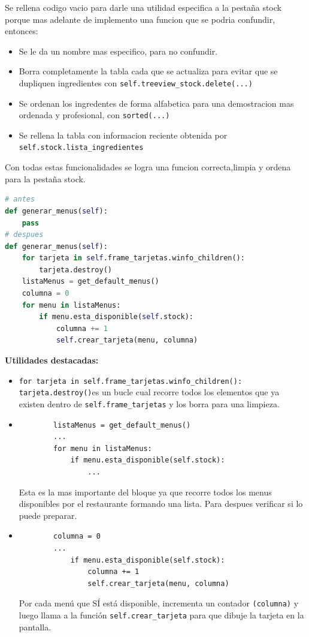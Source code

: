 \documentclass[a4paper,12pt]{article}
\begin{document}
Se rellena codigo vacio para darle una utilidad especifica a la pestaña stock porque mas adelante de implemento una funcion que se podria confundir, entonces:

\newpage

\begin{itemize}
    \item Se le da un nombre mas especifico, para no confundir.
    \item Borra completamente la tabla cada que se actualiza para evitar que se dupliquen ingredientes con \verb|self.treeview_stock.delete(...)|
    \item Se ordenan los ingredentes de forma alfabetica para una demostracion mas ordenada y profesional, con \verb|sorted(...)|
    \item Se rellena la tabla con informacion reciente obtenida por \verb|self.stock.lista_ingredientes|
\end{itemize}
Con todas estas funcionalidades se logra una funcion correcta,limpia y ordena para la pestaña stock.

\begin{lstlisting}[language=Python, caption={Implementaciones de codigo}, frame=single]
# antes
def generar_menus(self):
    pass
# despues
def generar_menus(self):
    for tarjeta in self.frame_tarjetas.winfo_children():
        tarjeta.destroy()
    listaMenus = get_default_menus()
    columna = 0
    for menu in listaMenus:
        if menu.esta_disponible(self.stock):
            columna += 1
            self.crear_tarjeta(menu, columna)
\end{lstlisting}
\textbf{Utilidades destacadas:}
\begin{itemize}
    \item \verb|for tarjeta in self.frame_tarjetas.winfo_children(): tarjeta.destroy()|es un bucle cual recorre todos los elementos que ya existen dentro de \verb|self.frame_tarjetas| y los borra para una limpieza.
    \item \begin{lstlisting}
        listaMenus = get_default_menus()
        ...
        for menu in listaMenus:
            if menu.esta_disponible(self.stock):
                ...
    \end{lstlisting}
    Esta es la mas importante del bloque ya que recorre todos los menus disponibles por el restaurante formando una lista. Para despues verificar si lo puede preparar.
    \item \begin{lstlisting}
        columna = 0
        ...
            if menu.esta_disponible(self.stock):
                columna += 1
                self.crear_tarjeta(menu, columna)
    \end{lstlisting}
    Por cada menú que SÍ está disponible, incrementa un contador \verb|(columna)| y luego llama a la función \verb|self.crear_tarjeta| para que dibuje la tarjeta en la pantalla.
\end{itemize}
\end{document}

